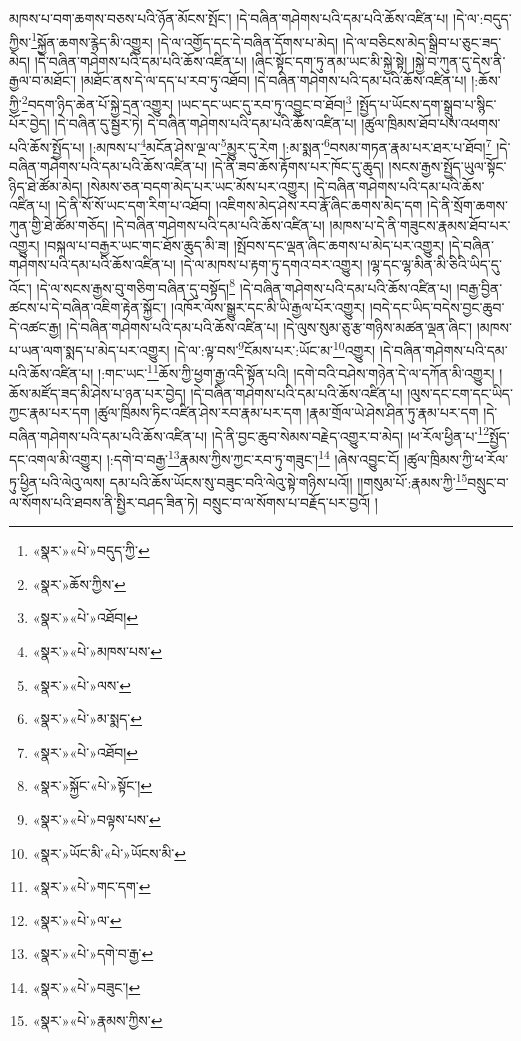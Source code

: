 མཁས་པ་བག་ཆགས་བཅས་པའི་ཉོན་མོངས་སྤོང་། །དེ་བཞིན་གཤེགས་པའི་དམ་པའི་ཆོས་འཛིན་པ། །དེ་ལ་:བདུད་ཀྱིས་\footnote{«སྣར་»«པེ་»བདུད་ཀྱི་}སྐྱོན་ཆགས་རྙེད་མི་འགྱུར། །དེ་ལ་འགྱོད་དང་དེ་བཞིན་དོགས་པ་མེད། །དེ་ལ་བཅིངས་མེད་སྒྲིབ་པ་ཅུང་ཟད་མེད། །དེ་བཞིན་གཤེགས་པའི་དམ་པའི་ཆོས་འཛིན་པ། །ཞིང་སྟོང་དག་ཏུ་ནམ་ཡང་མི་སྐྱེ་སྟེ། །སྐྱེ་བ་ཀུན་དུ་དེས་ནི་རྒྱལ་བ་མཐོང་། །མཐོང་ནས་དེ་ལ་དད་པ་རབ་ཏུ་འཐོབ། །དེ་བཞིན་གཤེགས་པའི་དམ་པའི་ཆོས་འཛིན་པ། །:ཆོས་ཀྱི་\footnote{«སྣར་»ཆོས་ཀྱིས་}བདག་ཉིད་ཆེན་པོ་སྐྱེ་དྲན་འགྱུར། །ཡང་དང་ཡང་དུ་རབ་ཏུ་འབྱུང་བ་ཐོབ།\footnote{«སྣར་»«པེ་»འཐོབ།} །སྤྱོད་པ་ཡོངས་དག་སྒྲུབ་པ་སྙིང་པོར་བྱེད། །དེ་བཞིན་དུ་སྦྱར་ཏེ། དེ་བཞིན་གཤེགས་པའི་དམ་པའི་ཆོས་འཛིན་པ། །ཚུལ་ཁྲིམས་ཐོབ་པས་འཕགས་པའི་ཆོས་སྤྱོད་པ། །:མཁས་པ་\footnote{«སྣར་»«པེ་»མཁས་པས་}མངོན་ཤེས་ལྔ་ལ་\footnote{«སྣར་»«པེ་»ལས་}མྱུར་དུ་རེག །:མ་སྨན་\footnote{«སྣར་»«པེ་»མ་སྨད་}བསམ་གཏན་རྣམ་པར་ཐར་པ་ཐོབ།\footnote{«སྣར་»«པེ་»འཐོབ།} །དེ་བཞིན་གཤེགས་པའི་དམ་པའི་ཆོས་འཛིན་པ། །དེ་ནི་ཟབ་ཆོས་རྟོགས་པར་ཁོང་དུ་ཆུད། །སངས་རྒྱས་སྤྱོད་ཡུལ་སྟོང་ཉིད་ཐེ་ཚོམ་མེད། །སེམས་ཅན་བདག་མེད་པར་ཡང་མོས་པར་འགྱུར། །དེ་བཞིན་གཤེགས་པའི་དམ་པའི་ཆོས་འཛིན་པ། །དེ་ནི་སོ་སོ་ཡང་དག་རིག་པ་འཐོབ། །འཇིགས་མེད་ཤེས་རབ་རྣོ་ཞིང་ཆགས་མེད་དག །དེ་ནི་སྲོག་ཆགས་ཀུན་གྱི་ཐེ་ཚོམ་གཅོད། །དེ་བཞིན་གཤེགས་པའི་དམ་པའི་ཆོས་འཛིན་པ། །མཁས་པ་དེ་ནི་གཟུངས་རྣམས་ཐོབ་པར་འགྱུར། །བསྐལ་པ་བརྒྱར་ཡང་གང་ཐོས་ཆུད་མི་ཟ། །སྤོབས་དང་ལྡན་ཞིང་ཆགས་པ་མེད་པར་འགྱུར། །དེ་བཞིན་གཤེགས་པའི་དམ་པའི་ཆོས་འཛིན་པ། །དེ་ལ་མཁས་པ་རྟག་ཏུ་དགའ་བར་འགྱུར། །ལྷ་དང་ལྷ་མིན་མི་ཅིའི་ཡིད་དུ་འོང་། །དེ་ལ་སངས་རྒྱས་བུ་གཅིག་བཞིན་དུ་བསྟོད།\footnote{«སྣར་»སྐྱོང་«པེ་»སྟོང་།} །དེ་བཞིན་གཤེགས་པའི་དམ་པའི་ཆོས་འཛིན་པ། །བརྒྱ་བྱིན་ཚངས་པ་དེ་བཞིན་འཇིག་རྟེན་སྐྱོང་། །འཁོར་ལོས་སྒྱུར་དང་མི་ཡི་རྒྱལ་པོར་འགྱུར། །བདེ་དང་ཡིད་བདེས་བྱང་ཆུབ་དེ་འཚང་རྒྱ། །དེ་བཞིན་གཤེགས་པའི་དམ་པའི་ཆོས་འཛིན་པ། །དེ་ལུས་སུམ་ཅུ་རྩ་གཉིས་མཚན་ལྡན་ཞིང་། །མཁས་པ་ཡན་ལག་སྨད་པ་མེད་པར་འགྱུར། །དེ་ལ་:ལྟ་བས་\footnote{«སྣར་»«པེ་»བལྟས་པས་}ངོམས་པར་:ཡོང་མ་\footnote{«སྣར་»ཡོང་མི་«པེ་»ཡོངས་མི་}འགྱུར། །དེ་བཞིན་གཤེགས་པའི་དམ་པའི་ཆོས་འཛིན་པ། །:གང་ཡང་\footnote{«སྣར་»«པེ་»གང་དག་}ཆོས་ཀྱི་ཕྱག་རྒྱ་འདི་སྟོན་པའི། །དགེ་བའི་བཤེས་གཉེན་དེ་ལ་དཀོན་མི་འགྱུར། །ཆོས་མཛོད་ཟད་མི་ཤེས་པ་ཉན་པར་བྱེད། །དེ་བཞིན་གཤེགས་པའི་དམ་པའི་ཆོས་འཛིན་པ། །ལུས་དང་ངག་དང་ཡིད་ཀྱང་རྣམ་པར་དག །ཚུལ་ཁྲིམས་ཏིང་འཛིན་ཤེས་རབ་རྣམ་པར་དག །རྣམ་གྲོལ་ཡེ་ཤེས་ཤིན་ཏུ་རྣམ་པར་དག །དེ་བཞིན་གཤེགས་པའི་དམ་པའི་ཆོས་འཛིན་པ། །དེ་ནི་བྱང་ཆུབ་སེམས་བརྗེད་འགྱུར་བ་མེད། །ཕ་རོལ་ཕྱིན་པ་\footnote{«སྣར་»«པེ་»ལ་}སྤྱོད་དང་འགལ་མི་འགྱུར། །:དགེ་བ་བརྒྱ་\footnote{«སྣར་»«པེ་»དགེ་བ་རྒྱ་}རྣམས་ཀྱིས་ཀྱང་རབ་ཏུ་གཟུང་།\footnote{«སྣར་»«པེ་»བཟུང་།} །ཞེས་འབྱུང་ངོ། །ཚུལ་ཁྲིམས་ཀྱི་ཕ་རོལ་ཏུ་ཕྱིན་པའི་ལེའུ་ལས། དམ་པའི་ཆོས་ཡོངས་སུ་བཟུང་བའི་ལེའུ་སྟེ་གཉིས་པའོ།། །།གསུམ་པོ་:རྣམས་ཀྱི་\footnote{«སྣར་»«པེ་»རྣམས་ཀྱིས་}བསྲུང་བ་ལ་སོགས་པའི་ཐབས་ནི་སྤྱིར་བཤད་ཟིན་ཏེ། བསྲུང་བ་ལ་སོགས་པ་བརྗོད་པར་བྱའོ། །
